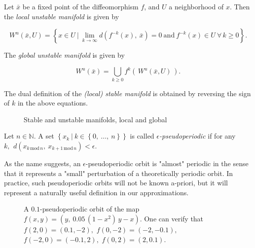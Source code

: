 \begin{definition}
    \cite*{dynbook} Let $\bar{x}$ be a fixed point of the diffeomorphism $f$, and $U$ a neighborhood of $x$. 
    Then the \emph{local unstable manifold} is given by

    \begin{equation}
        W^u(\bar{x}, U) = \left\{x \in U\ \vert\ \lim\limits_{k \to \infty} 
        d(f^{-k}(x),\ \bar{x}) = 0\ \text{and}\ f^{-k}(x) \in U\ \forall\, k \geq 0\right\}.
    \end{equation}

    The \emph{global unstable manifold} is given by

    \begin{equation}
        W^u(\bar{x}) = \bigcup\limits_{k \geq 0} f^k(\,W^u(\bar{x}, U)\,).
    \end{equation}

    The dual definition of the \emph{(local) stable manifold} is obtained by reversing the 
    sign of $k$ in the above equations.
\end{definition}

\begin{figure}[ht]
    \caption{\cite*{dynskript} Stable and unstable manifolds, local and global}
    \label{fig:manifold}    
\end{figure}

\begin{definition}[Pseudoperiodic]
    \cite*{dynbook} Let $n\in \mathbb{N}$. A set 
    $\left\{ x_k\ \vert\ k \in \left\{ 0,\ \dotsc ,\ n \right\} \right\}$ 
    is called \emph{$\epsilon$-pseudoperiodic} if for any
    $k,\,\ d(x_{k\, \text{mod}\, n},\ x_{k + 1\, \text{mod}\, n}) < \epsilon$.
\end{definition}

As the name suggests, an $\epsilon$-pseudoperiodic orbit is "almost" periodic in the sense 
that it represents a "small" perturbation of a theoretically periodic orbit. In practice,
such pseudoperiodic orbits will not be known a-priori, but it will represent a naturally 
useful definition in our approximations.

\begin{figure}[ht]
    \caption{
        \cite*{dynbook} A $0.1$-pseudoperiodic orbit of the map $f(x,y) = (y,\ 0.05\, (1 - x^2)\, y - x)$. 
        One can verify that $f(2, 0) = (0.1, -2),$ $f(0, -2) = (-2, -0.1),$ 
        $f(-2, 0) = (-0.1, 2),$ $f(0, 2) = (2, 0.1).$
    }
    \label{fig:pseudoperiodic}
\end{figure}

